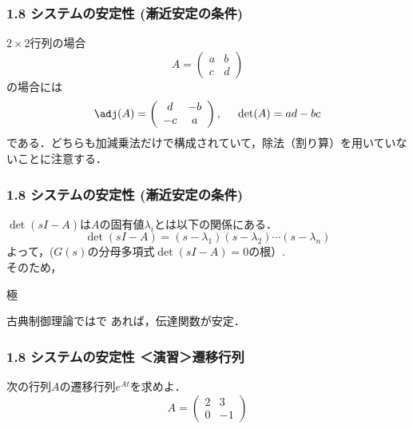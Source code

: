 \begin{frame}[t]
\frametitle{1.8 システムの安定性 (漸近安定の条件)}
$2 \times 2$行列の場合
\[
	A= \left(\begin{array}{cc}
		a & b \\
		c & d
	   \end{array} \right )
\]
の場合には
\[
	\adj(A) = 
		\left(\begin{array}{cc}
			d & -b \\
			-c & a
		\end{array} \right )
	, \hspace{5mm}
	\det(A)= ad -bc
\]
である．どちらも加減乗法だけで構成されていて，除法（割り算）を用いていないことに注意する．
\end{frame}


\begin{frame}[t]
\frametitle{1.8 システムの安定性 (漸近安定の条件)}
$\det (s I - A)$は$A$の固有値$\lambda_i$とは以下の関係にある．
\begin{equation}
 \det (s I - A)
  = (s - \lambda_1)(s - \lambda_2)\cdots(s - \lambda_n)
\end{equation}
よって，($G(s)$の分母多項式$\det (s I - A)=0$の根）.\\
そのため，

\begin{block}{極}
\\
\end{block}

古典制御理論ではで
あれば，伝達関数が安定．
\end{frame}


\begin{frame}[t]
\frametitle{1.8 システムの安定性 ＜演習＞遷移行列}
次の行列$A$の遷移行列$e^{At}$を求めよ．
\[
  A= \left(\begin{array}{cc}
    2 & 3 \\
    0 & -1
     \end{array} \right )
\]
\end{frame}


